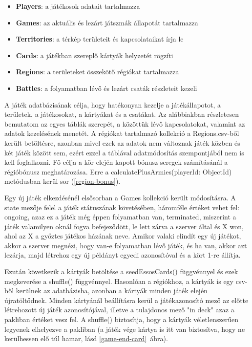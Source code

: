\documentclass[
]{thesis-ekf}
\theoremstyle{definition}
\theoremstyle{remark}
\begin{document}
\begin{itemize}
	\item \textbf{Players}: a játékosok adatait tartalmazza
	\item \textbf{Games}: az aktuális és lezárt játszmák állapotát tartalmazza
	\item \textbf{Territories}: a térkép területeit és kapcsolataikat írja le
	\item \textbf{Cards}: a játékban szereplő kártyák helyzetét rögzíti
	\item \textbf{Regions}: a területeket összekötő régiókat tartalmazza
	\item \textbf{Battles}: a folyamatban lévő és lezárt csaták részleteit kezeli
\end{itemize}

A játék adatbázisának célja, hogy hatékonyan kezelje a játékállapotot, a területek, a játékosokat, a kártyákat és a csatákat. Az alábbiakban részletesen bemutatom az egyes táblák szerepét, a közöttük lévő kapcsolatokat, valamint az adatok kezelésének menetét. A régiókat tartalmazó kollekció a Regions.csv-ből került betöltésre, azonban mivel ezek az adatok nem változnak játék közben és két játék között sem, ezért ezzel a táblával adatmódosítás szempontjából nem is kell foglalkozni. Fő célja a kör elején kapott bónusz seregek számításánál a régióbónusz meghatározása. Erre a calculatePlusArmies(playerId: ObjectId) metódusban kerül sor (\ref{region-bonus}).



Egy új játék elkezdésénél elsősorban a Games kollekció került módosításra. A state mezője felel a játék státuszának követésében, háromféle értéket vehet fel: ongoing, azaz ez a játék még éppen folyamatban van, terminated, miszerint a játék valamilyen oknál fogva befejeződött, le lett zárva a szerver által és X won, ahol az X a győztes játékos házának neve. Amikor valaki elindít egy új játékot, akkor a szerver megnézi, hogy van-e folyamatban lévő játék, és ha van, akkor azt lezárja, majd létrehoz egy új példányt egyedi azonosítóval és a kört 1-re állítja.

Ezután következik a kártyák betöltése a seedEssosCards() függvénnyel és ezek megkeverése a shuffle() függvénnyel. Hasonlóan a régiókhoz, a kártyák is egy csv-ből kerülnek az adatbázisba, azonban a kártyák minden játék elején újratöltődnek. Minden kártyánál beállításra kerül a játékazonosító mező az előtte létrehozott új játék azonosítójával, illetve a tulajdonos mező "in deck" azaz a pakliban értéket vesz fel. A shuffle() biztosítja, hogy a kártyák véletlenszerűen legyenek elhelyezve a pakliban (a játék vége kártya is itt van biztosítva, hogy ne kerülhessen elő túl hamar, lásd \ref{game-end-card}~ábra).
\end{document}
